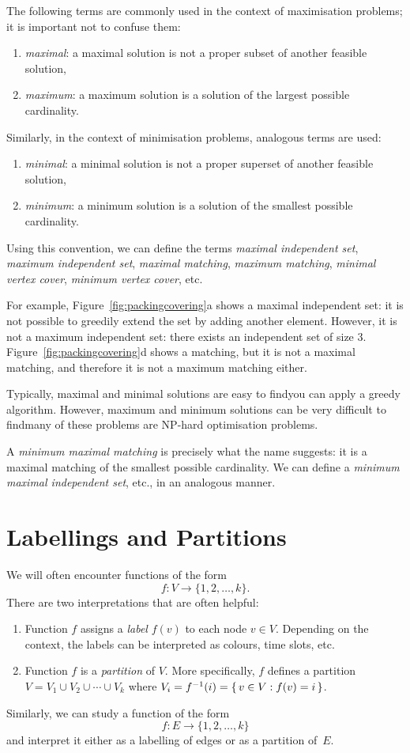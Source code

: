 The following terms are commonly used in the context of maximisation problems; it is important not to confuse them:
\begin{enumerate}
    \item \emph{maximal}: a maximal solution is not a proper subset of another feasible solution,
    \item \emph{maximum}: a maximum solution is a solution of the largest possible cardinality.
\end{enumerate}
Similarly, in the context of minimisation problems, analogous terms are used:
\begin{enumerate}
    \item \emph{minimal}: a minimal solution is not a proper superset of another feasible solution,
    \item \emph{minimum}: a minimum solution is a solution of the smallest possible cardinality.
\end{enumerate}
Using this convention, we can define the terms \emph{maximal independent set}, \emph{maximum independent set}, \emph{maximal matching}, \emph{maximum matching}, \emph{minimal vertex cover}, \emph{minimum vertex cover}, etc.

For example, Figure~\ref{fig:packingcovering}a shows a maximal independent set: it is not possible to greedily extend the set by adding another element. However, it is not a maximum independent set: there exists an independent set of size $3$. Figure~\ref{fig:packingcovering}d shows a matching, but it is not a maximal matching, and therefore it is not a maximum matching either.

Typically, maximal and minimal solutions are easy to find\mydash you can apply a greedy algorithm. However, maximum and minimum solutions can be very difficult to find\mydash many of these problems are NP-hard optimisation problems.

A \emph{minimum maximal matching} is precisely what the name suggests: it is a maximal matching of the smallest possible cardinality. We can define a \emph{minimum maximal independent set}, etc., in an analogous manner.


\section{Labellings and Partitions}\label{sec:partitions}

We will often encounter functions of the form \[f\colon V \to \{1,2,\dotsc,k\}.\] There are two interpretations that are often helpful:
\begin{enumerate}[label=(\roman*)]
    \item Function $f$ assigns a \emph{label} $f(v)$ to each node $v \in V$. Depending on the context, the labels can be interpreted as colours, time slots, etc.
    \item Function $f$ is a \emph{partition} of $V$. More specifically, $f$ defines a partition $V = V_1 \cup V_2 \cup \dotsb \cup V_k$ where $V_i = f^{-1}(i) = \{\,  v \in V : f(v) = i  \,\}$.
\end{enumerate}
Similarly, we can study a function of the form \[f\colon E \to \{1,2,\dotsc,k\}\] and interpret it either as a labelling of edges or as a partition of~$E$.

